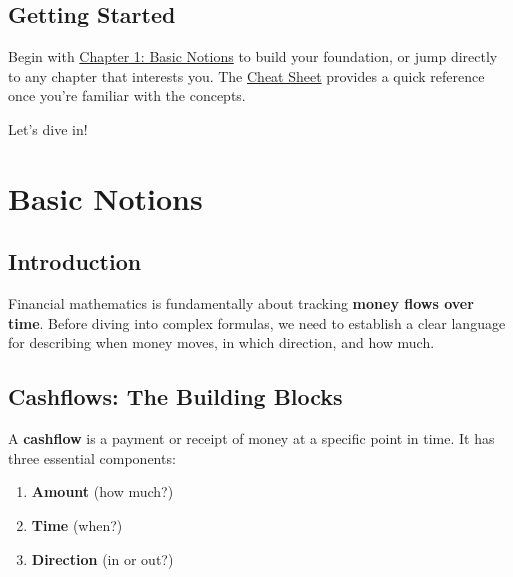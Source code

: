 \documentclass[
  letterpaper,
]{scrbook}
\providecommand{\tightlist}{%
  \setlength{\itemsep}{0pt}\setlength{\parskip}{0pt}}
\begin{document}
\section*{Getting Started}\label{getting-started}


Begin with \href{basic_notions.qmd}{Chapter 1: Basic Notions} to build
your foundation, or jump directly to any chapter that interests you. The
\href{cheat_sheet.qmd}{Cheat Sheet} provides a quick reference once
you're familiar with the concepts.

Let's dive in! 🚀


\chapter{Basic Notions}\label{basic-notions}

\section{Introduction}\label{introduction}

Financial mathematics is fundamentally about tracking \textbf{money
flows over time}. Before diving into complex formulas, we need to
establish a clear language for describing when money moves, in which
direction, and how much.

\section{Cashflows: The Building
Blocks}\label{cashflows-the-building-blocks}

\begin{tcolorbox}[enhanced jigsaw, toptitle=1mm, colbacktitle=quarto-callout-note-color!10!white, opacityback=0, leftrule=.75mm, breakable, colframe=quarto-callout-note-color-frame, toprule=.15mm, opacitybacktitle=0.6, coltitle=black, bottomrule=.15mm, colback=white, arc=.35mm, titlerule=0mm, rightrule=.15mm, left=2mm, title=\textcolor{quarto-callout-note-color}{\faInfo}\hspace{0.5em}{Definition: Cashflow}, bottomtitle=1mm]

A \textbf{cashflow} is a payment or receipt of money at a specific point
in time. It has three essential components:

\begin{enumerate}
\def\labelenumi{\arabic{enumi}.}
\tightlist
\item
  \textbf{Amount} (how much?)
\item
  \textbf{Time} (when?)
\item
  \textbf{Direction} (in or out?)
\end{enumerate}

\end{tcolorbox}
\end{document}

